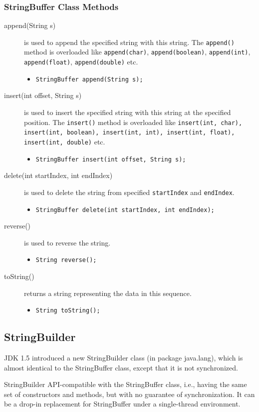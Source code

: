 \documentclass[11pt,a4paper]{article}
\begin{document}
\subsubsection*{StringBuffer Class Methods}
\begin{description}
\item [append(String s)] is used to append the specified string with this string. The \texttt{append()} method is overloaded like \texttt{append(char)}, \texttt{append(boolean)}, \texttt{append(int)}, \texttt{append(float)}, \texttt{append(double)} etc.

\begin{itemize}
\item \lstinline!StringBuffer append(String s);!
\end{itemize}
\item [insert(int offset, String s)]  is used to insert the specified string with this string at the specified position. The \texttt{insert()} method is overloaded like \texttt{insert(int, char), insert(int, boolean), insert(int, int), insert(int, float), insert(int, double)} etc.

\begin{itemize}
\item \lstinline!StringBuffer insert(int offset, String s);!
\end{itemize}
\item [delete(int startIndex, int endIndex)]  is used to delete the string from specified \texttt{startIndex} and \texttt{endIndex}.

\begin{itemize}
\item \lstinline!StringBuffer delete(int startIndex, int endIndex);!
\end{itemize}
\item [reverse()] is used to reverse the string.

\begin{itemize}
\item \lstinline!String reverse();!
\end{itemize}
\item [toString()]  returns a string representing the data in this sequence.

\begin{itemize}
\item \lstinline!String toString();!
\end{itemize}
\end{description}
\subsection*{StringBuilder}
JDK 1.5 introduced a new StringBuilder class (in package java.lang), which is almost identical to the StringBuffer class, except that it is not synchronized.

StringBuilder API-compatible with the StringBuffer class, i.e., having the same set of constructors and methods, but with no guarantee of synchronization. It can be a drop-in replacement for StringBuffer under a single-thread environment.
\end{document}
